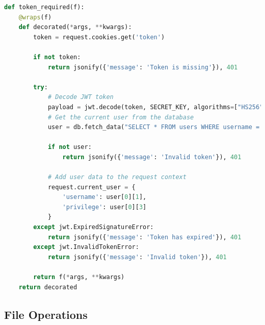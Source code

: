 \documentclass[11pt,a4paper]{article}
\begin{document}
\begin{lstlisting}[language=Python]
def token_required(f):
    @wraps(f)
    def decorated(*args, **kwargs):
        token = request.cookies.get('token')
        
        if not token:
            return jsonify({'message': 'Token is missing'}), 401
            
        try:
            # Decode JWT token
            payload = jwt.decode(token, SECRET_KEY, algorithms=["HS256"])
            # Get the current user from the database
            user = db.fetch_data("SELECT * FROM users WHERE username = ?", (payload['username'],))
            
            if not user:
                return jsonify({'message': 'Invalid token'}), 401
                
            # Add user data to the request context
            request.current_user = {
                'username': user[0][1],
                'privilege': user[0][3]
            }
        except jwt.ExpiredSignatureError:
            return jsonify({'message': 'Token has expired'}), 401
        except jwt.InvalidTokenError:
            return jsonify({'message': 'Invalid token'}), 401
            
        return f(*args, **kwargs)
    return decorated
\end{lstlisting}

\subsection{File Operations}
\end{document}

